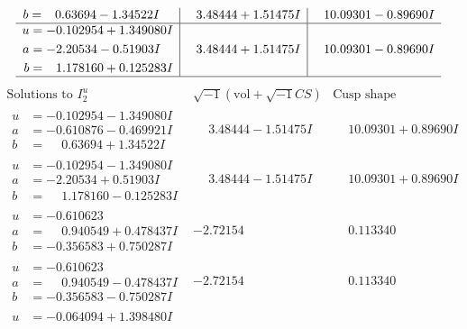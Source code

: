 \documentclass[1p]{elsarticle_modified}
\theoremstyle{definition}
\newcommand{\I}{\sqrt{-1}}
\begin{document}
$$\begin{array}{c|c|c}
\begin{aligned}
b &= \phantom{-}0.63694 - 1.34522 I\end{aligned}
 & \phantom{-}3.48444 + 1.51475 I & \phantom{-}10.09301 - 0.89690 I \\ \hline\begin{aligned}
u &= -0.102954 + 1.349080 I \\
a &= -2.20534 - 0.51903 I \\
b &= \phantom{-}1.178160 + 0.125283 I\end{aligned}
 & \phantom{-}3.48444 + 1.51475 I & \phantom{-}10.09301 - 0.89690 I\\
 \hline 
 \end{array}$$\newpage$$\begin{array}{c|c|c}  
\text{Solutions to }I^u_{2}& \I (\text{vol} + \sqrt{-1}CS) & \text{Cusp shape}\\
 \hline 
\begin{aligned}
u &= -0.102954 - 1.349080 I \\
a &= -0.610876 - 0.469921 I \\
b &= \phantom{-}0.63694 + 1.34522 I\end{aligned}
 & \phantom{-}3.48444 - 1.51475 I & \phantom{-}10.09301 + 0.89690 I \\ \hline\begin{aligned}
u &= -0.102954 - 1.349080 I \\
a &= -2.20534 + 0.51903 I \\
b &= \phantom{-}1.178160 - 0.125283 I\end{aligned}
 & \phantom{-}3.48444 - 1.51475 I & \phantom{-}10.09301 + 0.89690 I \\ \hline\begin{aligned}
u &= -0.610623\phantom{ +0.000000I} \\
a &= \phantom{-}0.940549 + 0.478437 I \\
b &= -0.356583 + 0.750287 I\end{aligned}
 & -2.72154\phantom{ +0.000000I} & \phantom{-}0.113340\phantom{ +0.000000I} \\ \hline\begin{aligned}
u &= -0.610623\phantom{ +0.000000I} \\
a &= \phantom{-}0.940549 - 0.478437 I \\
b &= -0.356583 - 0.750287 I\end{aligned}
 & -2.72154\phantom{ +0.000000I} & \phantom{-}0.113340\phantom{ +0.000000I} \\ \hline\begin{aligned}
u &= -0.064094 + 1.398480 I \\

\end{aligned}
\end{array}$$
\end{document}
